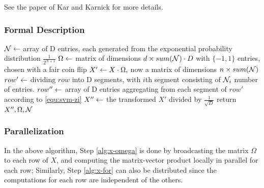 See the paper of Kar and Karnick \cite{KK12} for more details.


\subsubsection{Formal Description}

\begin{algorithm}
\begin{algorithmic}[1]
	\State ${\cal N} \leftarrow $ array of D entries, each generated from the exponential probability distribution $\frac{1}{2^{N+1}}$
	\State $\Omega \leftarrow $ matrix of dimensions $d\times sum({\cal N}) \cdot D$ with $\{-1,1\}$ entries, chosen with a fair coin flip
	\State $X'\leftarrow X\cdot \Omega,$ now a matrix of dimensions $n \times sum({\cal N})$
	\label{alg:x-omega}
	\label{alg:x-for}
		\State $row' \leftarrow $ dividing $row$ into D segments, with $i$th segment consisting of ${\cal N}_i$ number of entries.
		\State $row'' \leftarrow $ array of D entries aggregating from each segment of $row'$ according to \eqref{equ:svm-zi}
	\EndFor
	\State $X'' \leftarrow $ the transformed $X'$ divided by $\frac{1}{\sqrt{D}}$
	\State return $X'',\Omega, {\cal N}$
\end{algorithmic}
\end{algorithm}

\subsubsection{Parallelization}
In the above algorithm, Step \ref{alg:x-omega} is done by broadcasting the matrix $\Omega$ to each row of $X$, and computing the matrix-vector product locally in parallel for each row; Similarly, Step \ref{alg:x-for} can also be distributed since the computations for each row are independent of the others.



